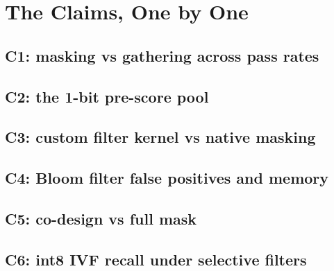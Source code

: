 \section{The Claims, One by One}
\label{sec:claims}
\subsection{C1: masking vs gathering across pass rates}\label{sec:c1}
\subsection{C2: the 1-bit pre-score pool}\label{sec:c2}
\subsection{C3: custom filter kernel vs native masking}\label{sec:c3}
\subsection{C4: Bloom filter false positives and memory}\label{sec:c4}
\subsection{C5: co-design vs full mask}\label{sec:c5}
\subsection{C6: int8 IVF recall under selective filters}\label{sec:c6}




